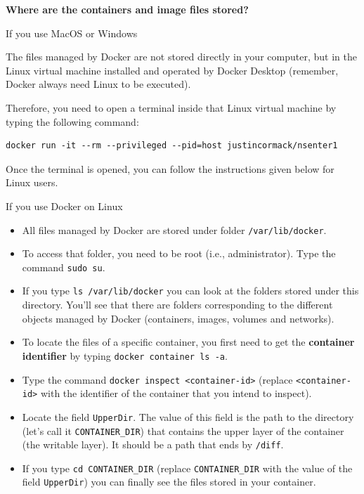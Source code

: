 \documentclass[
]{article}
\newenvironment{infobox}[1]
  {
  \begin{itemize}
  \renewcommand{\labelitemi}{
    \raisebox{-.7\height}[0pt][0pt]{
      
    }
  }
  \setlength{\fboxsep}{1em}
  \begin{whitebox}
  \item
  }
  {
  \end{whitebox}
  \end{itemize}
  }
\theoremstyle{definition}
\theoremstyle{definition}
\theoremstyle{definition}
\theoremstyle{remark}
\begin{document}
\begin{infobox}{warning}

\textbf{Where are the containers and image files stored?}

If you use MacOS or Windows

The files managed by Docker are not stored directly in your computer, but
in the Linux virtual machine installed and operated by Docker Desktop (remember, Docker always need Linux to be executed).

Therefore, you need to open a terminal inside that Linux virtual machine by typing the following command:

\begin{verbatim}
docker run -it --rm --privileged --pid=host justincormack/nsenter1
\end{verbatim}

Once the terminal is opened, you can follow the instructions given below for Linux users.

If you use Docker on Linux

\begin{itemize}
\item
  All files managed by Docker are stored under folder \texttt{/var/lib/docker}.
\item
  To access that folder, you need to be root (i.e., administrator). Type the command \texttt{sudo\ su}.
\item
  If you type \texttt{ls\ /var/lib/docker} you can look at the folders stored under this directory. You'll see that there are
  folders corresponding to the different objects managed by Docker (containers, images, volumes and networks).
\item
  To locate the files of a specific container, you first need to get the \textbf{container identifier} by typing \texttt{docker\ container\ ls\ -a}.
\item
  Type the command \texttt{docker\ inspect\ \textless{}container-id\textgreater{}} (replace \texttt{\textless{}container-id\textgreater{}} with the identifier of the container that you intend to inspect).
\item
  Locate the field \texttt{UpperDir}. The value of this field is the path to the directory (let's call it \texttt{CONTAINER\_DIR}) that contains the upper layer of the container (the writable layer).
  It should be a path that ends by \texttt{/diff}.
\item
  If you type \texttt{cd\ CONTAINER\_DIR} (replace \texttt{CONTAINER\_DIR} with the value of the field \texttt{UpperDir}) you can finally see the files stored in
  your container.
\end{itemize}

\end{infobox}
\end{document}
